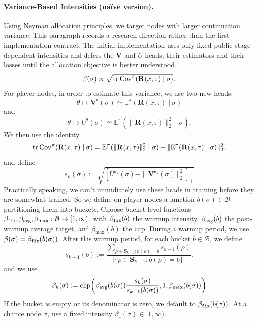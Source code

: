\documentclass[12pt, a4paper]{article}
\begin{document}
\paragraph{Variance-Based Intensities (naïve version).}
Using Neyman allocation principles, we target nodes with larger continuation variance.
This paragraph records a research direction rather than the first implementation contract.
The initial implementation uses only fixed public-stage-dependent intensities and defers the $\mathbf V$ and $U$ heads, their estimators and their losses until the allocation objective is better understood.
\begin{equation}\label{eq:branched-neyman-intensity}
  \beta(\sigma) \propto \sqrt{\operatorname{tr}\operatorname{Cov}^\pi(\mathbf{R}(x,\tau)\mid\sigma)}.
\end{equation}
For player nodes, in order to estimate this variance, we use two new heads:
\begin{equation}\label{eq:V-vector-head}
  \theta
  \longmapsto
  \mathbf V^\theta(\sigma)
  \simeq
  \mathbb{E}^\pi(\mathbf{R}(x,\tau)\mid \sigma)
\end{equation}
and
\begin{equation}\label{eq:U-head}
  \theta
  \longmapsto
  U^\theta(\sigma)
  \simeq
  \mathbb{E}^\pi(\|\mathbf{R}(x,\tau)\|_2^2\mid\sigma).
\end{equation}
We then use the identity
\[
  \operatorname{tr}\operatorname{Cov}^\pi(\mathbf{R}(x,\tau)\mid\sigma)
  =
  \mathbb{E}^\pi(\|\mathbf{R}(x,\tau)\|_2^2\mid\sigma)
  -
  \|\mathbb{E}^\pi(\mathbf{R}(x,\tau)\mid\sigma)\|_2^2.
\]
and define
\[
  s_k(\sigma)
  :=
  \sqrt{\left[U^{\theta_k}(\sigma)-\|\mathbf V^{\theta_k}(\sigma)\|_2^2\right]_+}
\]
Practically speaking, we can't immidiately use these heads in training before they are somewhat trained.
So we define on player nodes a function $b(\sigma) \in \mathcal{B}$ partitioning them into buckets.
Choose bucket-level functions $\beta_{\tt fix},\beta_{\tt avg},\beta_{\max}:\mathcal B\to[1,\infty)$, with $\beta_{\tt fix}(b)$ the warmup intensity, $\beta_{\tt avg}(b)$ the post-warmup average target, and $\beta_{\max}(b)$ the cap.
During a warmup period, we use $\beta(\sigma) = \beta_{\tt fix}(b(\sigma))$.
After this warmup period, for each bucket $b \in \mathcal{B}$, we define
\[
  \bar s_{k-1}(b)
  :=
  \frac{\sum_{\rho\in\mathbf S_{k-1}: b(\rho)=b}s_{k-1}(\rho)}
       {\left|\{\rho\in\mathbf S_{k-1}: b(\rho)=b\}\right|}.
\]
and we use
\[
  \beta_k(\sigma)
  :=
  \operatorname{clip}\!\left(\beta_{\tt avg}(b(\sigma))\frac{s_k(\sigma)}{\bar s_{k-1}(b(\sigma))},1,\beta_{\max}(b(\sigma))\right)
\]
If the bucket is empty or its denominator is zero, we default to $\beta_{\tt fix}(b(\sigma))$.
At a chance node $\sigma$, use a fixed intensity $\beta_{\mathsf c}(\sigma)\in[1,\infty)$.
\end{document}
